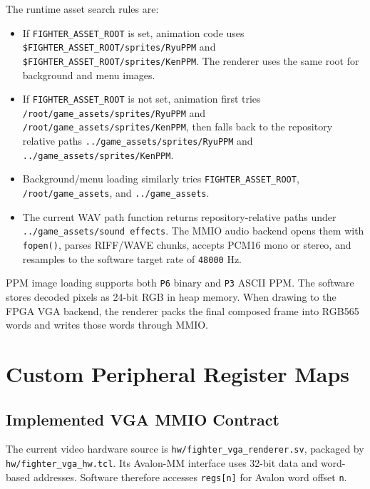 \documentclass[12pt,a4paper]{article}
\begin{document}
The runtime asset search rules are:

\begin{itemize}
  \item If \texttt{FIGHTER\_ASSET\_ROOT} is set, animation code uses
  \texttt{\$FIGHTER\_ASSET\_ROOT/sprites/RyuPPM} and
  \texttt{\$FIGHTER\_ASSET\_ROOT/sprites/KenPPM}. The renderer uses the same
  root for background and menu images.
  \item If \texttt{FIGHTER\_ASSET\_ROOT} is not set, animation first tries
  \texttt{/root/game\_assets/sprites/RyuPPM} and
  \texttt{/root/game\_assets/sprites/KenPPM}, then falls back to the repository
  relative paths \texttt{../game\_assets/sprites/RyuPPM} and
  \texttt{../game\_assets/sprites/KenPPM}.
  \item Background/menu loading similarly tries \texttt{FIGHTER\_ASSET\_ROOT},
  \texttt{/root/game\_assets}, and \texttt{../game\_assets}.
  \item The current WAV path function returns repository-relative paths under
  \texttt{../game\_assets/sound effects}. The MMIO audio backend opens them
  with \texttt{fopen()}, parses RIFF/WAVE chunks, accepts PCM16 mono or stereo,
  and resamples to the software target rate of \texttt{48000} Hz.
\end{itemize}

PPM image loading supports both \texttt{P6} binary and \texttt{P3} ASCII PPM.
The software stores decoded pixels as 24-bit RGB in heap memory. When drawing
to the FPGA VGA backend, the renderer packs the final composed frame into
RGB565 words and writes those words through MMIO.

\section{Custom Peripheral Register Maps}

\subsection{Implemented VGA MMIO Contract}

The current video hardware source is \texttt{hw/fighter\_vga\_renderer.sv},
packaged by \texttt{hw/fighter\_vga\_hw.tcl}. Its Avalon-MM interface uses
32-bit data and word-based addresses. Software therefore accesses
\texttt{regs[n]} for Avalon word offset \texttt{n}.
\end{document}
